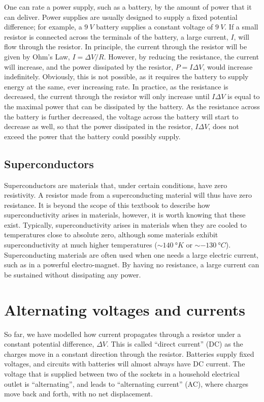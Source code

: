 One can rate a power supply, such as a battery, by the amount of power that it can deliver. Power supplies are usually designed to supply a fixed potential difference; for example, a $\SI{9}{V}$ battery supplies a constant voltage of $\SI{9}{V}$. If a small resistor is connected across the terminals of the battery, a large current, $I$, will flow through the resistor. In principle, the current through the resistor will be given by Ohm's Law, $I=\Delta V/R$. However, by reducing the resistance, the current will increase, and the power dissipated by the resistor, $P=I\Delta V $, would increase indefinitely. Obviously, this is not possible, as it requires the battery to supply energy at the same, ever increasing rate. In practice, as the resistance is decreased, the current through the resistor will only increase until $I \Delta V$ is equal to the maximal power that can be dissipated by the battery. As the resistance across the battery is further decreased, the voltage across the battery will start to decrease as well, so that the power dissipated in the resistor, $I \Delta V$, does not exceed the power that the battery could possibly supply.

\subsection{Superconductors}
Superconductors are materials that, under certain conditions, have zero resistivity. A resistor made from a superconducting material will thus have zero resistance. It is beyond the scope of this textbook to describe how superconductivity arises in materials, however, it is worth knowing that these exist. Typically, superconductivity arises in materials when they are cooled to temperatures close to absolute zero, although some materials exhibit superconductivity at much higher temperatures ($\sim\SI{140}{\degree K}$ or $\sim\SI{-130}{\degree C}$). Superconducting materials are often used when one needs a large electric current, such as in a powerful electro-magnet. By having no resistance, a large current can be sustained without dissipating any power.


\section{Alternating voltages and currents}
So far, we have modelled how current propagates through a resistor under a constant potential difference, $\Delta V$. This is called ``direct current'' (DC) as the charges move in a constant direction through the resistor. Batteries supply fixed voltages, and circuits with batteries will almost always have DC current. The voltage that is supplied between two of the sockets in a household electrical outlet is ``alternating'', and leads to ``alternating current'' (AC), where charges move back and forth, with no net displacement.

